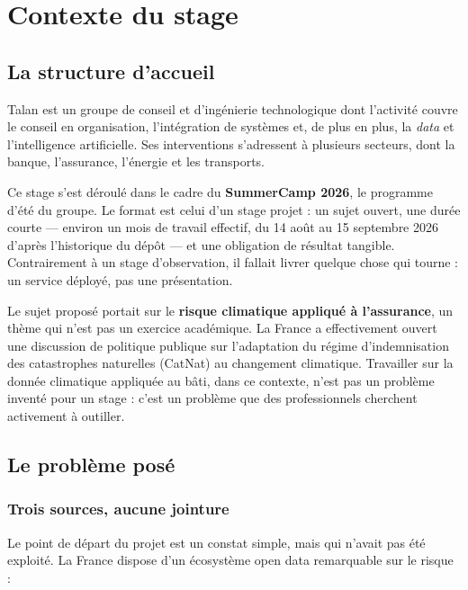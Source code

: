 \chapter{Contexte du stage}
\label{ch:contexte}

\section{La structure d'accueil}

Talan est un groupe de conseil et d'ingénierie technologique dont l'activité
couvre le conseil en organisation, l'intégration de systèmes et, de plus en
plus, la \emph{data} et l'intelligence artificielle. Ses interventions
s'adressent à plusieurs secteurs, dont la banque, l'assurance, l'énergie et les
transports.

Ce stage s'est déroulé dans le cadre du \textbf{SummerCamp 2026}, le programme
d'été du groupe. Le format est celui d'un stage projet : un sujet ouvert, une
durée courte — environ un mois de travail effectif, du 14 août au 15 septembre
2026 d'après l'historique du dépôt — et une obligation de résultat tangible.
Contrairement à un stage d'observation, il fallait livrer quelque chose qui
tourne : un service déployé, pas une présentation.

Le sujet proposé portait sur le \textbf{risque climatique appliqué à
l'assurance}, un thème qui n'est pas un exercice académique. La France a
effectivement ouvert une discussion de politique publique sur l'adaptation du
régime d'indemnisation des catastrophes naturelles (CatNat) au changement
climatique. Travailler sur la donnée climatique appliquée au bâti, dans ce
contexte, n'est pas un problème inventé pour un stage : c'est un problème que
des professionnels cherchent activement à outiller.

\section{Le problème posé}

\subsection{Trois sources, aucune jointure}

Le point de départ du projet est un constat simple, mais qui n'avait pas été
exploité. La France dispose d'un écosystème open data remarquable sur le
risque :

